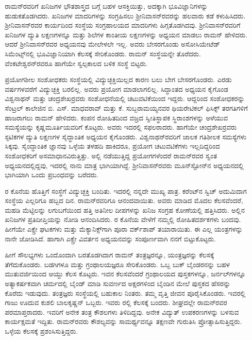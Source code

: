 ರಾಮನ್‍ರವರಿಗೆ ಖನಿಜಗಳ ಭೌತಶಾಸ್ತ್ರದ ಬಗ್ಗೆ ಬಹಳ ಆಸಕ್ತಿಯಿತ್ತು, ಅದಕ್ಕಾಗಿ ಭೂವಿಜ್ಞಾನಿಗಳನ್ನು ಹುಡುಕತೊಡಗಿದರು. ಖನಿಜಗಳ ಮಾದರಿಗಳನ್ನು ಸಂಗ್ರಹಿಸಲು ಶ‍್ರೀನಿವಾಸನ್‍ರವರನ್ನು ಹಲವಾರು ಕಡೆ ಕಳುಹಿಸಿದರು. ಶ‍್ರೀನಿವಾಸನ್‍ರವರ ಕಾರ್ಯದಿಂದ ಸಂಸ್ಥೆಯ ಸಂಗ್ರಹಾಲಯದ ಮಾದರಿಗಳು ಹಿಗ್ಗತೊಡಗಿದವು. ಶ‍್ರೀನಿವಾಸನ್‍ರವರಿಗೆ ಖನಿಜಗಳ ದ್ಯುತಿ ಲಕ್ಷಣಗಳನ್ನೂ ಮತ್ತು ಶಿಲೆಗಳ ಕಾಂತೀಯ ಲಕ್ಷಣಗಳನ್ನು ಅಧ್ಯಯನ ಮಾಡಲು ರಾಮನ್ ಹೇಳಿದರು. ಆದರೆ ಶ‍್ರೀನಿವಾಸನ್‍ರವರ ಅಧ್ಯಯನವು ಮೇಲೇಳಲೇ ಇಲ್ಲ. ಅವರು ಬೇಸರಗೊಂಡು ಅಸೋಸಿಯೇಟೆಡ್ ಸಿಮೆಂಟ್ಸ್‌ನಲ್ಲಿ ಭೂವಿಜ್ಞಾನಿಯಾಗಿ ಕೆಲಸಕ್ಕೆ ಸೇರಿಕೊಂಡರು. ರಾಮನ್ ಸಂಸ್ಥೆಯನ್ನೇ ತೊರೆದರು. ವೆಂಕಟೇಶ್ವರನ್‍ರವರೂ ಹಾಗೆಯೇ ಸ್ವಲ್ಪಕಾಲದ ಬಳಿಕ ಸಂಸ್ಥೆ ಬಿಟ್ಟರು.

ಪ್ರಯೋಗಶೀಲ ಸಂಶೋಧಕರು ಸಂಸ್ಥೆಯಲ್ಲಿ ವಿದ್ಯುಚ್ಛಕ್ತಿಯಿಲ್ಲದ ಕಾರಣ ಬಲು ಬೇಗ ಬೇಸರಗೊಂಡರು. ಎರಡು ವರ್ಷಗಳವರೆಗೆ ವಿದ್ಯುಚ್ಛಕ್ತಿ ಬರಲಿಲ್ಲ. ಅವರು ಪ್ರಯೋಗ ಮಾಡಲಾಗಲಿಲ್ಲ. ಸಿದ್ಧಾಂತದ ಅಧ್ಯಯನ ಕೈಗೊಂಡ ವಿಶ್ವನಾಥನ್ ಮತ್ತು ಚಂದ್ರಶೇಖರ್‍ರವರು ಸಂಶೋಧನೆಯಲ್ಲಿ ಚಟುವಟಿಕೆಯಿಂದ ಇದ್ದರು. ಆದ್ದರಿಂದ ಸಂಶೋಧಕರನ್ನು ಸೆಂಟ್ರಲ್ ಕಾಲೇಜಿನ ಬಿ. ಎಸ್. ಮಾಧವರಾವ್ ಮತ್ತು ಕೆ. ಸುಬ್ಬರಾಮಯ್ಯನವರ ಥಿಯರೇಟಿಕಲ್ ಫಿಸಿಕ್ಸ್ ತರಗತಿಗಳಿಗೆ ಹಾಜರಾಗಲು ರಾಮನ್ ಹೇಳಿದರು. ಕಂಪನ ರೋಹಿತದಿಂದ ವಜ್ರದ ಸ್ವೀತಿಸ್ಥಾಪಕ ಸ್ಥಿರಾಂಶಗಳನ್ನು ಅಳೆಯುವ ಸಮಸ್ಯೆಯನ್ನು ಕೃಷ್ಣಮೂರ್ತಿಯವರಿಗೆ ಕೊಟ್ಟರು. ಅವರು ಇದರಲ್ಲಿ ಸಫಲರಾದರು. ಹಾಗೆಯೇ ಚಂದ್ರಶೇಖರ್‍ರವರು ಸ್ಫಟಿಕಗಳ ದ್ಯುತಿ ಲಕ್ಷಣಗಳ ಸೈದ್ಧಾಂತಿಕ ಅಧ್ಯಯನ ಕೈಗೊಂಡರು. ವಿಶ್ವನಾಥನ್‍ರವರಿಗೆ ಜಾಲಕ ಗತಿಶೀಲಕ ಸಮಸ್ಯೆಗಳು ಸಿಕ್ಕವು. ಸೈಂದ್ಧಾಂತಿಕ ಜ್ಞಾನವು ಒಳ್ಳೆಯ ತಳಹದಿ ಹಾಕಿದರೂ, ಪ್ರಯೋಗ ಚಟುವಟಿಕೆಗಳು ಇಲ್ಲದಿದ್ದರಿಂದ ಸಂಶೋಧಕರಿಗೆ ಅಸಮಾಧಾನವಿರುತ್ತಿತ್ತು. ಅಲ್ಲಿ ನಡೆಯುತ್ತಿದ್ದ ಪ್ರಯೋಗಗಳೆಂದರೆ ರಾಮನ್‍ರವರ ಸ್ವಂತ ಅಧ್ಯಯನದಲ್ಲಿದ್ದವು, ಇದರಲ್ಲಿ ನಾನು ಮಾತ್ರ ಭಾಗಿಯಾಗಿದ್ದೆ. ಶ‍್ರೀನಿವಾಸನ್‍ರವರು ಮೂನ್‍ಸ್ಟೋನ್‍ನ ಅಧ್ಯಯನದಲ್ಲಿ ಭಾಗಿಯಾಗಿ ಒಂದು ಪ್ರಬಂಧವನ್ನು ಬರೆದರು.

ರ ಕೊನೆಯ ಹೊತ್ತಿಗೆ ಸಂಸ್ಥೆಗೆ ವಿದ್ಯುಚ್ಛಕ್ತಿ ಬಂದಿತು. ಇದರಲ್ಲಿ ನನ್ನದೇ ಮುಖ್ಯ ಪಾತ್ರ. ಕರೆಂಟ್‍ನ ಸ್ವಿಚ್ ಅದುಮಿದಾಗ ಸಂಸ್ಥೆಯ ಎಲ್ಲರಿಗೂ ಹಬ್ಬದ ದಿನ. ರಾಮನ್‍ರವರಿಗೂ ಆನಂದವಾಯಿತು. ಅವರು ಮಾಡಿದ ಮೊದಲ ಕೆಲಸವೆಂದರೆ, ಮಹಡಿ ಮೆಟ್ಟಿಲನ್ನು ಲಗುಬಗೆಯಿಂದ ಹತ್ತಿ ಅತಿನೀಲ ದೀಪಗಳನ್ನು ಖನಿಜ ಸಂಗ್ರಹ ಕೋಣೆಯಲ್ಲಿ ಹತ್ತಿಸಿದರು. ಅಲ್ಲಿನ ಖನಿಜಗಳ ಪ್ರತಿದೀಪ್ತಿಯನ್ನು ನೋಡಿ ಆನಂದಿಸಿದರು. ರ ಕೊನೆಯ ವೇಳೆಗೆ ನಮ್ಮಲ್ಲಿ ರೋಹಿತದರ್ಶಕಗಳು ಬಂದವು. ಹೀಗೆಯೇ ಎಕ್ಸ್\enginline{-}ರೇ ಘಟಕಗಳು ಮತ್ತು ಮೆಕ್ಯಾನಿಕ್ಸ್‌ಗಾಗಿ ಪೂರಾ ವರ್ಕ್‌ಶಾಪ್ ತಯಾರಾಯಿತು. ಈ ಎಲ್ಲ ಯಂತ್ರಗಳನ್ನು ನಾನೇ ಜೋಡಿಸಿದೆ. ಹಾಗಾಗಿ ಎಕ್ಸ್\enginline{-}ರೇ ವಿವರ್ತನ ಅಧ್ಯಯನವನ್ನು ಸಂಪೂರ್ಣವಾಗಿ ನನಗೆ ಬಿಟ್ಟುಕೊಟ್ಟರು.

ಹೀಗೆ ಸೌಲಭ್ಯಗಳು ಒಂದೊಂದಾಗಿ ಬರತೊಡಗಿದಾಗ ರಾಮನ್ ತಂತ್ರಜ್ಞರನ್ನೂ, ಯಂತ್ರಜ್ಞರನ್ನು ಕೆಲಸಕ್ಕೆ ತೆಗೆದುಕೊಂಡರು. ಬಡಗಿಗಳೂ ಮತ್ತು ಗ್ರಂಥಾಲಯಜ್ಞರೂ ಸೇರಿಕೊಂಡರು. ಒಬ್ಬ ಬುಕ್ ಬೈಂಡರನನ್ನು ಬಹಳ ಮುತುವರ್ಜಿಯಿಂದ ಆಯ್ದು ಕೆಲಸ ಕೊಟ್ಟರು. ಇವನ ಕೆಲಸವೆಂದರೆ ಗ್ರಂಥಾಲಯದ ಪುಸ್ತಕಗಳನ್ನೂ, ಜರ್ನಲ್‍ಗಳನ್ನೂ ಅತ್ಯಾಕರ್ಷಕವಾಗಿ ಚರ್ಮದಲ್ಲಿ ಬೈಂಡ್ ಮಾಡಿ ಸುವರ್ಣದ ಅಕ್ಷರಗಳಿಂದ ಬೈಂಡಿನ ಮೇಲೆ ಪುಸ್ತಕದ ಹೆಸರನ್ನು ಕೊರೆದು ಇಡುವುದು. ತಂತ್ರಜ್ಞರು ಸಂಸ್ಥೆಯಲ್ಲಿ ಬಹುಕಾಲ ನಿಂತರು. ತಮ್ಮ ವೃತ್ತಿ ಜೀವನ ಪೂರೈಸಿಕೊಂಡರು. ಇವರಲ್ಲಿ ಗಾಜು ಊದುವ ಕುಶಲಿ ಬಾಲಕೃಷ್ಣನ್ ಒಬ್ಬರು. ಇವರು ರಲ್ಲಿ ಕೆಲಸಕ್ಕೆ ಬಂದರು. ಶೀಘ್ರದಲ್ಲೇ ರಾಮನ್‍ರವರ ಪರಮಾಪ್ತರಾದರು. ಇವರಿಗೆ ಅನೇಕ ತಂತ್ರ ಕೌಶಲಗಳು ತಿಳಿದಿದ್ದವು. ಅನೇಕ ವಿದ್ಯುತ್ ಉಪಕರಣಗಳನ್ನು ಬಳಸುವ ಕಾರ್ಯಕ್ಷಮತೆ ಇದ್ದಿತು. ರಾಮನ್‍ರವರು ಕೌಶಲ್ಯವನ್ನು ಸಾಮರ್ಥ್ಯವನ್ನೂ ತಕ್ಷಣವೇ ಗುರುತಿಸಿ ಪ್ರೋತ್ಸಾಹಿಸುತ್ತಿದ್ದರು. ಒಳ್ಳೆಯ ಕೆಲಸಕ್ಕೆ ಪ್ರಶಂಸಿಸುತ್ತಿದ್ದರು.

